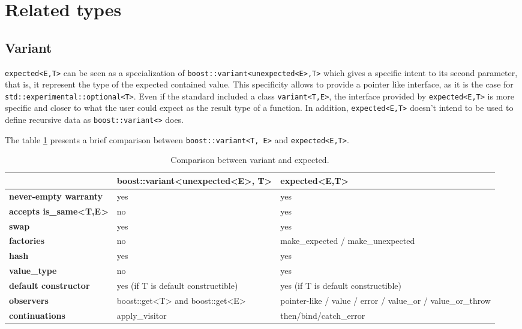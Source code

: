 \documentclass[a4paper,10pt]{article}
\newcommand{\cpp}[1]{\lstinline{#1}}
\begin{document}
\section{Related types}

\subsection{Variant}

\cpp{expected<E,T>} can be seen as a specialization of  \cpp{boost::variant<unexpected<E>,T>} which gives a specific intent to its second parameter, that is, it represent the type of the expected contained value. This specificity allows to provide a pointer like interface, as it is the case for \cpp{std::experimental::optional<T>}. Even if the standard included a class  \cpp{variant<T,E>}, the interface provided by \cpp{expected<E,T>} is more specific and closer to what the user could expect as the result type of a function. In addition, \cpp{expected<E,T>} doesn't intend to be used to define recursive data as \cpp{boost::variant<>} does.

The table \ref{comp-variant} presents a brief comparison between \cpp{boost::variant<T, E>} and \cpp{expected<E,T>}.

\begin{table}
\bgroup
\def\arraystretch{1.5}
\begin{tabular}
{|l|>{\raggedright\arraybackslash}p{6cm}|>{\raggedright\arraybackslash}p{6cm}|}
\hline
                    & \textbf{boost::variant<unexpected<E>, T>} & \textbf{expected<E,T>}  \\
\hline
\textbf{never-empty warranty} & yes & yes \\
\hline
\textbf{accepts is_same<T,E>} & no & yes \\
\hline
\textbf{swap} & yes & yes \\
\hline
\textbf{factories} & no & make\_expected / make\_unexpected  \\
\hline
\textbf{hash} & yes & yes  \\
\hline
\textbf{value_type} & no & yes  \\
\hline
\textbf{default constructor} & yes (if T is default constructible) & yes (if T is default constructible)  \\
\hline
\textbf{observers} & boost::get<T> and boost::get<E> & pointer-like / value / error / value_or / value_or_throw \\
\hline
\textbf{continuations} & apply_visitor & then/bind/catch_error  \\
\hline
\end{tabular}
\egroup
\caption{Comparison between variant and expected.}
\label{comp-variant}
\end{table}
\end{document}
